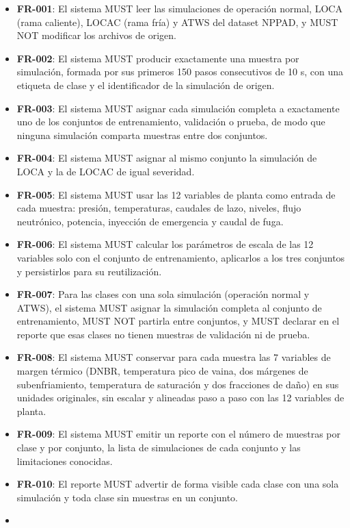 \documentclass[12pt,a4paper]{article}
\providecommand{\tightlist}{\setlength{\itemsep}{0pt}\setlength{\parskip}{0pt}}
\newenvironment{documentogenerado}[2]{%
  \def\doccomando{#1}\def\docruta{#2}%
  \par\begingroup\small\setstretch{1.15}\sloppy%
}{\endgroup\par\medskip}
\begin{document}
\begin{documentogenerado}{/speckit-specify + /speckit-clarify}{specs\slash 001-preparacion-datos\slash spec.md}
\begin{itemize}
\tightlist
\item
  \textbf{FR-001}: El sistema MUST leer las simulaciones de operación normal, LOCA (rama caliente), LOCAC (rama fría) y ATWS del dataset NPPAD, y MUST NOT modificar los archivos de origen.
\item
  \textbf{FR-002}: El sistema MUST producir exactamente una muestra por simulación, formada por sus primeros 150 pasos consecutivos de 10 s, con una etiqueta de clase y el identificador de la simulación de origen.
\item
  \textbf{FR-003}: El sistema MUST asignar cada simulación completa a exactamente uno de los conjuntos de entrenamiento, validación o prueba, de modo que ninguna simulación comparta muestras entre dos conjuntos.
\item
  \textbf{FR-004}: El sistema MUST asignar al mismo conjunto la simulación de LOCA y la de LOCAC de igual severidad.
\item
  \textbf{FR-005}: El sistema MUST usar las 12 variables de planta como entrada de cada muestra: presión, temperaturas, caudales de lazo, niveles, flujo neutrónico, potencia, inyección de emergencia y caudal de fuga.
\item
  \textbf{FR-006}: El sistema MUST calcular los parámetros de escala de las 12 variables solo con el conjunto de entrenamiento, aplicarlos a los tres conjuntos y persistirlos para su reutilización.
\item
  \textbf{FR-007}: Para las clases con una sola simulación (operación normal y ATWS), el sistema MUST asignar la simulación completa al conjunto de entrenamiento, MUST NOT partirla entre conjuntos, y MUST declarar en el reporte que esas clases no tienen muestras de validación ni de prueba.
\item
  \textbf{FR-008}: El sistema MUST conservar para cada muestra las 7 variables de margen térmico (DNBR, temperatura pico de vaina, dos márgenes de subenfriamiento, temperatura de saturación y dos fracciones de daño) en sus unidades originales, sin escalar y alineadas paso a paso con las 12 variables de planta.
\item
  \textbf{FR-009}: El sistema MUST emitir un reporte con el número de muestras por clase y por conjunto, la lista de simulaciones de cada conjunto y las limitaciones conocidas.
\item
  \textbf{FR-010}: El reporte MUST advertir de forma visible cada clase con una sola simulación y toda clase sin muestras en un conjunto.
\item

\end{itemize}
\end{documentogenerado}
\end{document}
